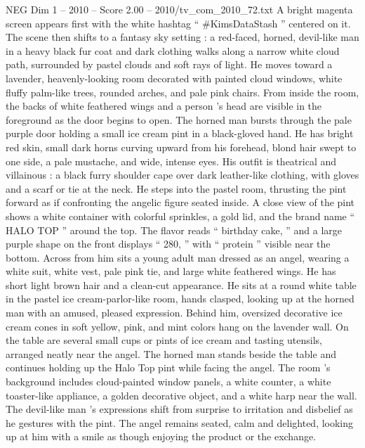\begin{textsample}{NEG Dim 1 – 2010 – Score 2.00 – 2010/tv\_com\_2010\_72.txt}  \label{ex:f1_neg_079}
A bright magenta screen appears first with the white hashtag “ \#KimsDataStash ” centered on it.
The scene then shifts to a fantasy sky setting : a red-faced, horned, devil-like man in a heavy black fur coat and dark clothing walks along a narrow white cloud path, surrounded by pastel clouds and soft rays of light.
He moves toward a lavender, heavenly-looking room decorated with painted cloud windows, white fluffy palm-like trees, rounded arches, and pale pink chairs.
From inside the room, the backs of white feathered wings and a person ’s head are visible in the foreground as the door begins to open.
The horned man bursts through the pale purple door holding a small ice cream pint in a black-gloved hand.
He has bright red skin, small dark horns curving upward from his forehead, blond hair swept to one side, a pale mustache, and wide, intense eyes.
His outfit is theatrical and villainous : a black furry shoulder cape over dark leather-like clothing, with gloves and a scarf or tie at the neck.
He steps into the pastel room, thrusting the pint forward as if confronting the angelic figure seated inside.
A close view of the pint shows a white container with colorful sprinkles, a gold lid, and the brand name “ HALO TOP ” around the top.
The flavor reads “ birthday cake, ” and a large purple shape on the front displays “ 280, ” with “ protein ” visible near the bottom.
Across from him sits a young adult man dressed as an angel, wearing a white suit, white vest, pale pink tie, and large white feathered wings.
He has short light brown hair and a clean-cut appearance.
He sits at a round white table in the pastel ice cream-parlor-like room, hands clasped, looking up at the horned man with an amused, pleased expression.
Behind him, oversized decorative ice cream cones in soft yellow, pink, and mint colors hang on the lavender wall.
On the table are several small cups or pints of ice cream and tasting utensils, arranged neatly near the angel.
The horned man stands beside the table and continues holding up the Halo Top pint while facing the angel.
The room ’s background includes cloud-painted window panels, a white counter, a white toaster-like appliance, a golden decorative object, and a white harp near the wall.
The devil-like man ’s expressions shift from surprise to irritation and disbelief as he gestures with the pint.
The angel remains seated, calm and delighted, looking up at him with a smile as though enjoying the product or the exchange.

\end{textsample}

